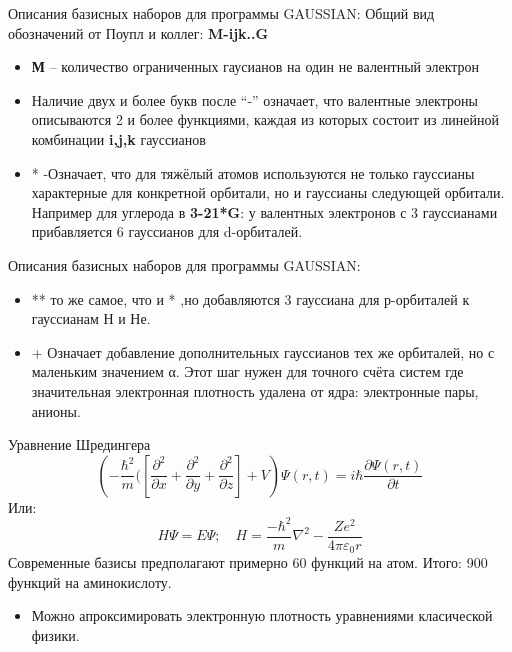 \begin{frame}{Описания базисных наборов для программы GAUSSIAN:}
    Общий вид обозначений от Поупл и коллег:  \textbf{M-ijk..G}
    \begin{itemize}
        \item \textbf{М} – количество ограниченных  гаусианов на один не валентный электрон
        \item Наличие двух  и более букв после “-” означает, что  валентные электроны описываются 2 и более функциями,
            каждая из     которых состоит из линейной комбинации \textbf{i,j,k}  гауссианов
        \item * -Означает, что для тяжёлый атомов используются не только гауссианы характерные для конкретной орбитали,
            но и     гауссианы следующей орбитали. \\
         \vspace{0.5cm}
         Например для углерода в \textbf{3-21*G}:  у валентных электронов с 3 гауссианами прибавляется  6 гауссианов для d-орбиталей. 
        \end{itemize}
\end{frame}

\begin{frame}{Описания базисных наборов для программы GAUSSIAN:}
    \begin{itemize}
\item ** то же самое, что и * ,но добавляются 3 гауссиана для р-орбиталей к гауссианам Н и Не.
    \vspace{1cm}

\item  + Означает добавление дополнительных гауссианов тех же орбиталей, но с маленьким значением α. Этот шаг нужен для
    точного счёта систем где значительная электронная плотность удалена от ядра: электронные пары, анионы.
\end{itemize}
\end{frame}




\begin{frame}{Уравнение Шредингера}
	\[ \left ( -\frac{\hbar^2}{m}( \left [ \frac{\partial^2}{\partial x} + \frac{\partial^2}{\partial y} + \frac{\partial^2}{\partial z} \right ] +V \right )
		\Psi (r,t) = i\hbar \frac{\partial \Psi(r,t)}{\partial t} 
	\]
	Или:
	\[
		H\Psi = E\Psi ; \quad H= \frac{-\hbar^2}{m} \nabla^2 - \frac{Ze^2}{4\pi \varepsilon_0 r}
	\]
	Современные базисы предполагают примерно 60 функций на атом. Итого: 900 функций на аминокислоту.
    \vspace{1cm}
    \begin{itemize}
    \item  Можно апроксимировать электронную плотность уравнениями класической физики.
   \end{itemize}

\end{frame}



